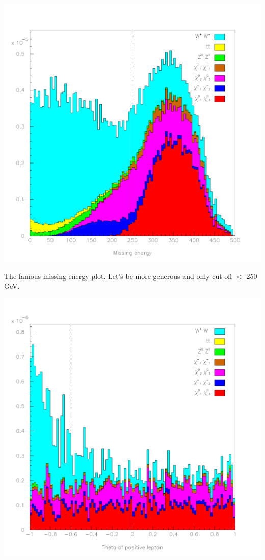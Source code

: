 \documentclass[landscape]{article}
\begin{document}
\huge
\renewcommand{\labelitemi}{-}
\setlength{\parindent}{0 cm}

\begin{center} \includegraphics[height=0.8\textheight]{withtheta_1.pdf} \end{center}

The famous missing-energy plot.  Let's be more generous and only cut off $<$ 250 GeV.

\pagebreak

\begin{center} \includegraphics[height=0.8\textheight]{withtheta_2.pdf} \end{center}
\end{document}
